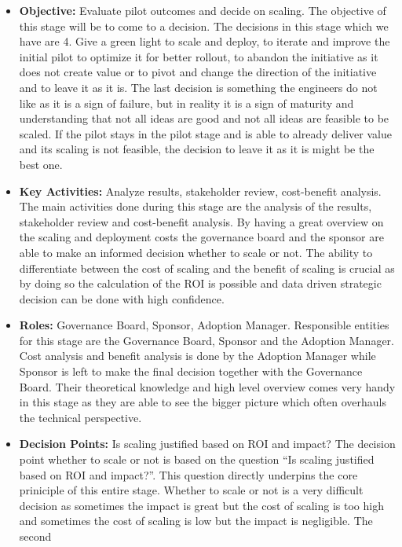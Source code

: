 \documentclass[]{imc-inf}
\begin{document}
\begin{itemize}
	\item
	\textbf{Objective:} Evaluate pilot outcomes and decide on scaling. The
	objective of this stage will be to come to a decision. The decisions
	in this stage which we have are 4. Give a green light to scale and
	deploy, to iterate and improve the initial pilot to optimize it for
	better rollout, to abandon the initiative as it does not create value
	or to pivot and change the direction of the initiative and to leave it
	as it is. The last decision is something the engineers do not like as
	it is a sign of failure, but in reality it is a sign of maturity and
	understanding that not all ideas are good and not all ideas are
	feasible to be scaled. If the pilot stays in the pilot stage and is
	able to already deliver value and its scaling is not feasible, the
	decision to leave it as it is might be the best one.
	\item
	\textbf{Key Activities:} Analyze results, stakeholder review,
	cost-benefit analysis. The main activities done during this stage are
	the analysis of the results, stakeholder review and cost-benefit
	analysis. By having a great overview on the scaling and deployment
	costs the governance board and the sponsor are able to make an
	informed decision whether to scale or not. The ability to
	differentiate between the cost of scaling and the benefit of scaling
	is crucial as by doing so the calculation of the ROI is possible and
	data driven strategic decision can be done with high confidence.
	\item
	\textbf{Roles:} Governance Board, Sponsor, Adoption Manager.
	Responsible entities for this stage are the Governance Board, Sponsor
	and the Adoption Manager. Cost analysis and benefit analysis is done
	by the Adoption Manager while Sponsor is left to make the final
	decision together with the Governance Board. Their theoretical
	knowledge and high level overview comes very handy in this stage as
	they are able to see the bigger picture which often overhauls the
	technical perspective.
	\item
	\textbf{Decision Points:} Is scaling justified based on ROI and
	impact? The decision point whether to scale or not is based on the
	question ``Is scaling justified based on ROI and impact?''. This
	question directly underpins the core priniciple of this entire stage.
	Whether to scale or not is a very difficult decision as sometimes the
	impact is great but the cost of scaling is too high and sometimes the
	cost of scaling is low but the impact is negligible. The second

\end{itemize}
\end{document}
